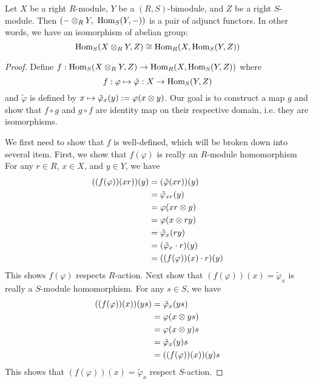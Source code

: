 \begin{thm}  \label{thm: ten-hom adjunct}
    Let $X$ be a right $R$-module, $Y$ be a $(R,S)$-bimodule, and $Z$ be a right $S$-module. Then $(-\otimes_R Y,\ \operatorname{Hom}_S(Y,-))$ is a pair of adjunct functors. In other words, we have an isomorphism of abelian group:
    \[\operatorname{Hom}_S(X\otimes_R Y, Z)\cong \operatorname{Hom}_R(X, \operatorname{Hom}_S(Y,Z))\]
\end{thm}
\begin{proof}
    Define $f:\operatorname{Hom}_S(X\otimes_R Y, Z) \to \operatorname{Hom}_R(X, \operatorname{Hom}_S(Y,Z))$ where 
    \[f: \varphi \mapsto \tilde\varphi:X\to \operatorname{Hom}_S(Y,Z)\]
    and $\tilde\varphi$ is defined by $x\mapsto \tilde\varphi_x(y) := \varphi(x\otimes y)$. Our goal is to construct a map $g$ and show that $f\circ g$ and $g\circ f$ are identity map on their respective domain, i.e. they are isomorphisms.

    We first need to show that $f$ is well-defined, which will be broken down into several item. First, we show that $f(\varphi)$ is really an $R$-module homomorphism For any $r\in R$, $x\in X$, and $y\in Y$, we have
    \begin{align*}
            ((f(\varphi))(xr))(y) 
            &= (\tilde\varphi(xr))(y) \\
            &= \tilde\varphi_{xr}(y) \\
            &= \varphi(xr\otimes y) \\
            &= \varphi(x\otimes ry) \\
            &= \tilde\varphi_x(ry) \\
            &= (\tilde\varphi_x\cdot r)(y) \\
            &= ((f(\varphi))(x)\cdot r)(y)
        \end{align*}
    This shows $f(\varphi)$ respects $R$-action. Next show that $(f(\varphi))(x) = \tilde\varphi_x$ is really a $S$-module homomorphism. For any $s\in S$, we have
    \begin{align*}
            ((f(\varphi))(x))(ys) 
            &= \tilde\varphi_x(ys) \\
            &= \varphi(x\otimes ys)\\
            &= \varphi(x\otimes y) s \\
            &= \tilde\varphi_x(y) s\\
            &= ((f(\varphi))(x))(y) s
        \end{align*}
    This shows that $(f(\varphi))(x) = \tilde\varphi_x$ respect $S$-action.


\end{proof}
